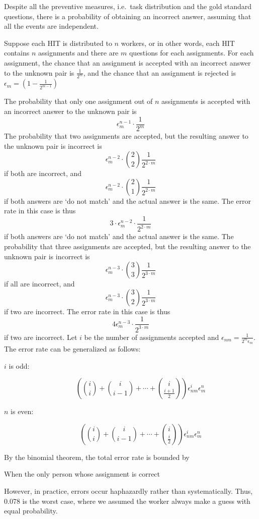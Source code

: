 Despite all the preventive measures, i.e.\ task distribution and the gold standard
questions, there is a probability of obtaining an incorrect answer, assuming
that all the events are independent.

Suppose each HIT is distributed to $n$ workers, or in other words, each HIT
contains $n$ assignments and there are $m$ questions for each assignments.
For each assignment, the chance that an assignment is accepted with
an incorrect answer to the unknown pair is $\frac{1}{2^m}$, and the chance
that an assignment is rejected is $\epsilon_m = (1-\frac{1}{2^{m-1}})$

The probability that only one assignment out of $n$ assignments is accepted with
an incorrect answer to the unknown pair is
$$\epsilon_m^{n-1} \cdot \frac{1}{2^m}$$
The probability that two assignments are accepted, but the resulting answer to the
unknown pair is incorrect is
$$\epsilon_m^{n-2} \cdot \binom{2}{2}\frac{1}{2^{2\cdot m}}$$
if both are incorrect, and
$$\epsilon_m^{n-2} \cdot \binom{2}{1}\frac{1}{2^{2\cdot m}}$$
if both answers are `do not match' and the actual answer is the same.
The error rate in this case is thus
$$3 \cdot \epsilon_m^{n-2} \cdot \frac{1}{2^{2\cdot m}}$$
if both answers are `do not match' and the actual answer is the same.
The probability that three assignments are accepted, but the resulting answer to the
unknown pair is incorrect is
$$\epsilon_m^{n-3} \cdot \binom{3}{3}\frac{1}{2^{3\cdot m}}$$
if all are incorrect, and
$$\epsilon_m^{n-3} \cdot \binom{3}{2}\frac{1}{2^{3\cdot m}}$$
if two are incorrect.
The error rate in this case is thus
$$4 \epsilon_m^{n-3} \cdot \frac{1}{2^{3\cdot m}}$$
if two are incorrect.
Let $i$ be the number of assignments accepted and 
$\epsilon_{nm} = \frac{1}{2^m\epsilon_m}$.
The error rate can be generalized as follows:
\begin{description}
  \item[$i$ is odd:]
  $$(\binom{i}{i} + \binom{i}{i-1} + \cdots + \binom{i}{\frac{i+1}{2}})\epsilon_{nm}^i \epsilon_m^n$$
  \item[$n$ is even:]
  $$(\binom{i}{i} + \binom{i}{i-1} + \cdots + \binom{i}{\frac{i}{2}})\epsilon_{nm}^i \epsilon_m^n$$
\end{description}
By the binomial theorem, the total error rate is bounded by



When the only person whose assignment is correct


However, in practice, errors occur haphazardly rather than systematically.
Thus, 0.078 is the worst case, where we assumed the worker always make a guess 
with equal probability.

